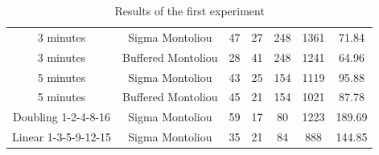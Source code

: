 \documentclass[compress,9pt,xcolor={dvipsnames,table}]{beamer}
\begin{document}
\begin{frame}[t]
\begin{table}[t]
{\begin{tabular}{@{}ccccccc@{}}
3 minutes & Sigma Montoliou     & 47 & 27 & 248 & 1361 & 71.84 \\
3 minutes & Buffered Montoliou  & 28 & 41 & 248 & 1241 & 64.96 \\
\cmidrule{1-7}

5 minutes & Sigma Montoliou     & 43 & 25 & 154 & 1119 & 95.88 \\
5 minutes & Buffered Montoliou  & 45 & 21 & 154 & 1021 & 87.78 \\
\cmidrule{1-7}

Doubling 1-2-4-8-16 & Sigma Montoliou   & 59 & 17 & 80 & 1223 & 189.69 \\
Linear 1-3-5-9-12-15 &  Sigma Montoliou & 35 & 21 & 84 & 888 & 144.85 \\

\bottomrule
\end{tabular}
}
\caption{Results of the first experiment}
\label{tbl:experiment-1}
\end{table}
\end{frame}


\end{document}
